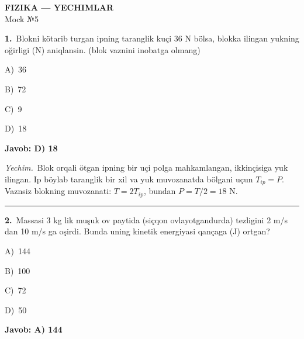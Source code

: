 \documentclass[11pt,a4paper]{article}
\newcommand{\opt}[2]{\hspace*{4mm}#1)\ #2\par}
\begin{document}
\begin{center}{\Large\textbf{FIZIKA — YECHIMLAR}}\\[2pt]{\large Mock №5}\end{center}
\noindent\begin{minipage}{\linewidth}
\textbf{1.}\ Blokni kötarib turgan ipning taranglik kuçi 36 N bölsa, blokka ilingan yukning oğirligi (N) aniqlansin. (blok vaznini inobatga olmang)\par\smallskip
\noindent\hspace*{4mm}\par\smallskip
\opt{A}{36}
\opt{B}{72}
\opt{C}{9}
\opt{D}{18}
\end{minipage}\vspace{2pt}\par
\noindent\colorbox{gray!12}{\parbox{\dimexpr\linewidth-2\fboxsep}{\textbf{Javob: D) 18}}}\par\smallskip
\noindent\textit{Yechim.}\ Blok orqali ötgan ipning bir uçi polga mahkamlangan, ikkinçisiga yuk ilingan. Ip böylab taranglik bir xil va yuk muvozanatda bölgani uçun $T_{ip}=P$. Vaznsiz blokning muvozanati: $T=2T_{ip}$, bundan $P=T/2=18$ N.\par\par\medskip\hrule\medskip
{}\noindent\begin{minipage}{\linewidth}
\textbf{2.}\ Massasi 3 kg lik muşuk ov paytida (siçqon ovlayotgandurda) tezligini 2 m/s dan 10 m/s ga oşirdi. Bunda uning kinetik energiyasi qançaga (J) ortgan?\par\smallskip
\opt{A}{144}
\opt{B}{100}
\opt{C}{72}
\opt{D}{50}
\end{minipage}\vspace{2pt}\par
\noindent\colorbox{gray!12}{\parbox{\dimexpr\linewidth-2\fboxsep}{\textbf{Javob: A) 144}}}\par\smallskip
\end{document}
